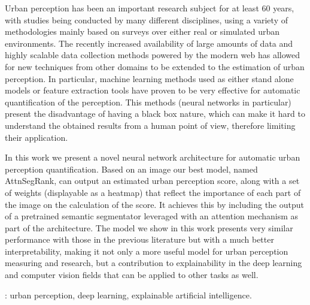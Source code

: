 Urban perception has been an important research subject for at least 60 years, with studies
being conducted by many different disciplines, using a variety of methodologies mainly based
on surveys over either real or simulated urban environments. The recently increased availability
of large amounts of data and highly scalable data collection methods powered by the modern web
has allowed for new techniques from other domains to be extended to the estimation of urban perception.
In particular, machine learning methods used as either stand alone models or feature extraction tools
have proven to be very effective for automatic quantification of the perception. This methods
(neural networks in particular) present the disadvantage of having a black box
nature, which can make it hard to understand the obtained results from a human point of view,
therefore limiting their application.

In this work we present a novel neural network architecture for automatic urban perception quantification.
Based on an image our best model, named AttnSegRank, can output an estimated urban perception score,
along with a set of weights (displayable as a heatmap) that reflect the importance of each part of the image
on the calculation of the score. It achieves this by including the output of a pretrained
semantic segmentator leveraged with an attention mechanism as part of the architecture. The model
we show in this work presents very similar performance with those in the previous literature but
with a much better interpretability, making it  not only a more useful model for urban perception
measuring and research, but a contribution to explainability in
the deep learning and computer vision fields that can be applied to other tasks as well.


\vfill
{}:  urban perception, deep learning, explainable artificial intelligence.
